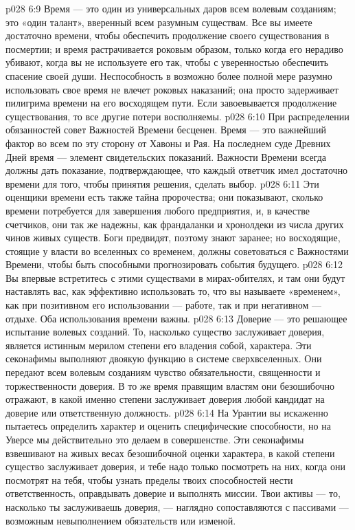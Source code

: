 \vs p028 6:9 \bibnobreakspace {} Время --- это один из универсальных даров всем волевым созданиям; это «один талант», вверенный всем разумным существам. Все вы имеете достаточно времени, чтобы обеспечить продолжение своего существования в посмертии; и время растрачивается роковым образом, только когда его нерадиво убивают, когда вы не используете его так, чтобы с уверенностью обеспечить спасение своей души. Неспособность в возможно более полной мере разумно использовать свое время не влечет роковых наказаний; она просто задерживает пилигрима времени на его восходящем пути. Если завоевывается продолжение существования, то все другие потери восполняемы.
\vs p028 6:10 При распределении обязанностей совет Важностей Времени бесценен. Время --- это важнейший фактор во всем по эту сторону от Хавоны и Рая. На последнем суде Древних Дней время --- элемент свидетельских показаний. Важности Времени всегда должны дать показание, подтверждающее, что каждый ответчик имел достаточно времени для того, чтобы принятия решения, сделать выбор.
\vs p028 6:11 Эти оценщики времени есть также тайна пророчества; они показывают, сколько времени потребуется для завершения любого предприятия, и, в качестве счетчиков, они так же надежны, как франдаланки и хронолдеки из числа других чинов живых существ. Боги предвидят, поэтому знают заранее; но восходящие, стоящие у власти во вселенных со временем, должны советоваться с Важностями Времени, чтобы быть способными прогнозировать события будущего.
\vs p028 6:12 Вы впервые встретитесь с этими существами в мирах\hyp{}обителях, и там они будут наставлять вас, как эффективно использовать то, что вы называете «временем», как при позитивном его использовании --- работе, так и при негативном --- отдыхе. Оба использования времени важны.
\vs p028 6:13 \bibnobreakspace {} Доверие --- это решающее испытание волевых созданий. То, насколько существо заслуживает доверия, является истинным мерилом степени его владения собой, характера. Эти секонафимы выполняют двоякую функцию в системе сверхвселенных. Они передают всем волевым созданиям чувство обязательности, священности и торжественности доверия. В то же время правящим властям они безошибочно отражают, в какой именно степени заслуживает доверия любой кандидат на доверие или ответственную должность.
\vs p028 6:14 На Урантии вы искаженно пытаетесь определить характер и оценить специфические способности, но на Уверсе мы действительно это делаем в совершенстве. Эти секонафимы взвешивают на живых весах безошибочной оценки характера, в какой степени существо заслуживает доверия, и тебе надо только посмотреть на них, когда они посмотрят на тебя, чтобы узнать пределы твоих способностей нести ответственность, оправдывать доверие и выполнять миссии. Твои активы --- то, насколько ты заслуживаешь доверия, --- наглядно сопоставляются с пассивами --- возможным невыполнением обязательств или изменой.
